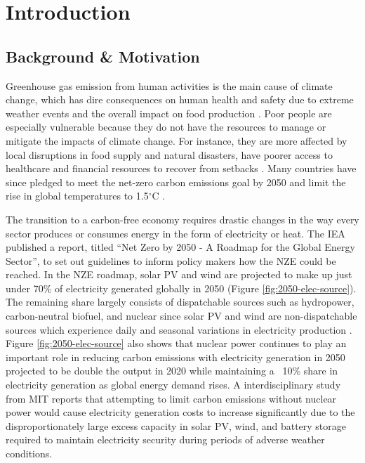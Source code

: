 \section{Introduction}

\subsection{Background \& Motivation}

Greenhouse gas emission from human activities is the main cause of climate
change, which has dire consequences on human health and safety due to extreme
weather events and the overall impact on food production
\cite{mcmichael_global_2004}. Poor people are especially vulnerable because
they do not have the resources to manage or mitigate the impacts of climate
change. For instance, they are more affected by local disruptions in food
supply and natural disasters, have poorer access to healthcare and financial
resources to recover from setbacks \cite{hallegatte_shock_2016}. Many countries
have since pledged to meet the net-zero carbon emissions goal by 2050 and limit
the rise in global temperatures to 1.5$^{\circ}$C \cite{iea_net_2021}.

The transition to a carbon-free economy requires drastic changes in the way
every sector produces or consumes energy in the form of electricity or heat.
The \gls{IEA} published a report, titled ``Net Zero by 2050 - A Roadmap for the
Global Energy Sector'', to set out guidelines to inform policy makers how the
\gls{NZE} could be reached. In the \gls{NZE} roadmap,
solar \gls{PV} and wind are projected to make up just under 70\% of
electricity generated globally in 2050 (Figure \ref{fig:2050-elec-source}).
The remaining share largely consists of dispatchable sources such as
hydropower, carbon-neutral biofuel, and nuclear since solar \gls{PV} and wind
are non-dispatchable sources which experience daily and seasonal variations in
electricity production \cite{forsberg_market_2020}. Figure
\ref{fig:2050-elec-source} also shows that nuclear power continues
to play an important role in reducing carbon emissions with electricity
generation in 2050 projected to be double the output in 2020 while maintaining
a ~10\% share in electricity generation as global energy demand rises. A
interdisciplinary study from \gls{MIT} reports that attempting to limit carbon
emissions without nuclear power would cause electricity generation costs to
increase significantly due to the disproportionately large excess capacity in
solar \gls{PV}, wind, and battery storage required to maintain electricity
security during periods of adverse weather conditions.

